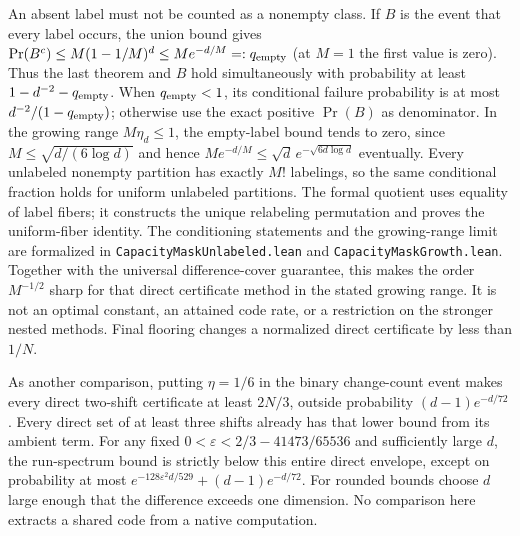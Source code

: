 An absent label must not be counted as a nonempty class. If $B$ is the event
that every label occurs, the union bound gives
$\Pr(B^c)\le M(1-1/M)^d\le M e^{-d/M}=:q_{\rm empty}$ (at $M=1$ the
first value is zero). Thus the last theorem and $B$ hold simultaneously
with probability at least $1-d^{-2}-q_{\rm empty}$. When
$q_{\rm empty}<1$, its conditional failure probability is at most
$d^{-2}/(1-q_{\rm empty})$; otherwise use the exact positive $\Pr(B)$
as denominator. In the growing range $M\eta_d\le1$, the empty-label bound
tends to zero, since $M\le\sqrt{d/(6\log d)}$ and hence
$M e^{-d/M}\le\sqrt d\,e^{-\sqrt{6d\log d}}$ eventually. Every unlabeled
nonempty partition has exactly $M!$ labelings, so the same conditional
fraction holds for uniform unlabeled partitions. The formal quotient uses
equality of label fibers; it constructs the unique relabeling permutation
and proves the uniform-fiber identity. The conditioning statements and
the growing-range limit are formalized in
\texttt{CapacityMaskUnlabeled.lean} and \texttt{CapacityMaskGrowth.lean}. Together with the
universal difference-cover guarantee, this makes the order $M^{-1/2}$
sharp for that direct certificate method in the stated growing range.
It is not an optimal constant, an attained code rate, or a restriction on
the stronger nested methods. Final flooring changes a normalized direct
certificate by less than $1/N$.

As another comparison, putting $\eta=1/6$ in the binary change-count event
makes every direct two-shift certificate at least $2N/3$, outside
probability $(d-1)e^{-d/72}$. Every direct set of at least three shifts
already has that lower bound from its ambient term. For any fixed
$0<\varepsilon<2/3-41473/65536$ and sufficiently large $d$, the run-spectrum
bound is strictly below this entire direct envelope, except on probability
at most $e^{-128\varepsilon^2d/529}+(d-1)e^{-d/72}$. For rounded bounds
choose $d$ large enough that the difference exceeds one dimension.
No comparison here extracts a shared code from a native computation.
